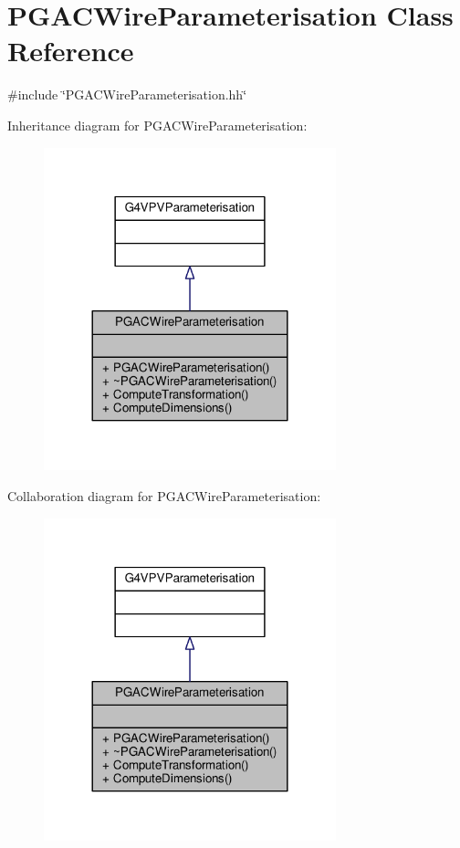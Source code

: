 \hypertarget{classPGACWireParameterisation}{}\section{P\+G\+A\+C\+Wire\+Parameterisation Class Reference}
\label{classPGACWireParameterisation}


{\ttfamily \#include \char`\"{}P\+G\+A\+C\+Wire\+Parameterisation.\+hh\char`\"{}}



Inheritance diagram for P\+G\+A\+C\+Wire\+Parameterisation\+:
\nopagebreak
\begin{figure}[H]
\begin{center}
\leavevmode
\includegraphics[width=240pt]{classPGACWireParameterisation__inherit__graph}
\end{center}
\end{figure}


Collaboration diagram for P\+G\+A\+C\+Wire\+Parameterisation\+:
\nopagebreak
\begin{figure}[H]
\begin{center}
\leavevmode
\includegraphics[width=240pt]{classPGACWireParameterisation__coll__graph}
\end{center}
\end{figure}
